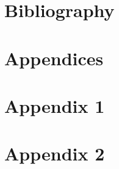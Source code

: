 \documentclass{article}
\begin{document}
 \newpage
 \listoffigures
 \listoftables
 
 \section{Bibliography} %
 
 \newpage
 
 {}
 
 
 \newpage
 \section{Appendices}
 \begin{appendices}
  \section*{Appendix 1}
  \section*{Appendix 2}
 \end{appendices}
 
 
\end{document}
